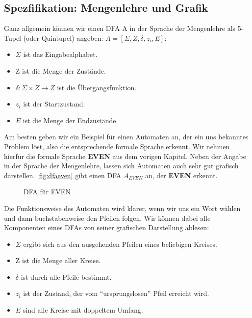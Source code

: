 \subsection{Spezfifikation: Mengenlehre und Grafik}
Ganz allgemein können wir einen DFA A in der Sprache der Mengenlehre
als 5-Tupel (oder Quintupel) angeben: $A = [\Sigma, Z, \delta, z_i, E]$:
\begin{itemize}
    \item $\Sigma$ ist das Eingabealphabet.
    \item Z ist die Menge der Zustände.
    \item $\delta: \Sigma \times Z \rightarrow Z$ ist die Übergangsfunktion.
    \item $z_i$ ist der Startzustand.
    \item $E$ ist die Menge der Endzustände.
\end{itemize}

Am besten geben wir ein Beispiel für einen Automaten an,
der ein uns bekanntes Problem löst,
also die entsprechende formale Sprache erkennt.
Wir nehmen hierfür die formale Sprache \textbf{EVEN} aus dem vorigen Kapitel.
Neben der Angabe in der Sprache der Mengenlehre,
lassen sich Automaten auch sehr gut grafisch darstellen.
\autoref{fig:dfaeven} gibt einen DFA $A_{EVEN}$ an,
der \textbf{EVEN} erkennt.

\begin{figure}[ht] %
\centering %
\caption{DFA für EVEN}
\label{fig:dfaeven}
\end{figure}

Die Funktionsweise des Automaten wird klarer, wenn wir uns ein Wort wählen
und dann buchstabenweise den Pfeilen folgen.
Wir können dabei alle Komponenten eines DFAs von seiner grafischen Darstellung ablesen:
\begin{itemize}
    \item $\Sigma$ ergibt sich aus den ausgehenden Pfeilen eines beliebigen Kreises.
    \item Z ist die Menge aller Kreise.
    \item $\delta$ ist durch alle Pfeile bestimmt.
    \item $z_i$ ist der Zustand,
        der vom ``ursprungslosen'' Pfeil erreicht wird.
    \item $E$ sind alle Kreise mit doppeltem Umfang.
\end{itemize}

